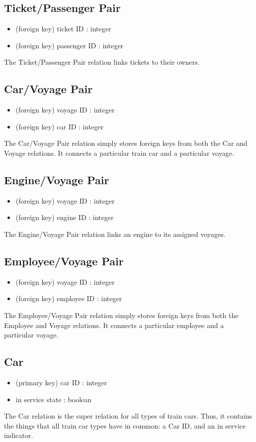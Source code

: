 \documentclass[a4paper]{article}
\begin{document}
\subsection*{Ticket/Passenger Pair}
\begin{itemize}
\item (foreign key) ticket ID : integer
\item (foreign key) passenger ID : integer
\end{itemize}
The Ticket/Passenger Pair relation links tickets to their owners.

\subsection*{Car/Voyage Pair}
\begin{itemize}
\item (foreign key) voyage ID : integer
\item (foreign key) car ID : integer
\end{itemize}
The Car/Voyage Pair relation simply stores foreign keys from both the Car and Voyage relations. It connects a particular train car and a particular voyage.

\subsection*{Engine/Voyage Pair}
\begin{itemize}
\item (foreign key) voyage ID : integer
\item (foreign key) engine ID : integer
\end{itemize}
The Engine/Voyage Pair relation links an engine to its assigned voyages.

\subsection*{Employee/Voyage Pair}
\begin{itemize}
\item (foreign key) voyage ID : integer
\item (foreign key) employee ID : integer
\end{itemize}
The Employee/Voyage Pair relation simply stores foreign keys from both the Employee and Voyage relations. It connects a particular employee and a particular voyage.

\subsection*{Car}
\begin{itemize}
\item (primary key) car ID : integer
\item in service state : boolean
\end{itemize}
The Car relation is the super relation for all types of train cars. Thus, it contains the things that all train car types have in common: a Car ID, and an in service indicator.
\end{document}
